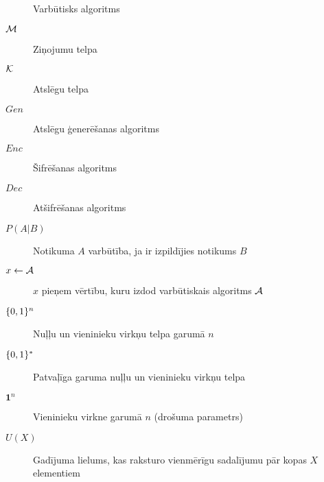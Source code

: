 \begin{description}
    \item[\ppt] Varbūtisks algoritms
    \item[$\mathcal{M}$]Ziņojumu telpa
    \item[$\mathcal{K}$]Atslēgu telpa
    \item[$Gen$]Atslēgu ģenerēšanas algoritms
    \item[$Enc$]Šifrēšanas algoritms
    \item[$Dec$]Atšifrēšanas algoritms
    \item[$P(A|B)$]Notikuma $A$ varbūtība, ja ir izpildījies notikums $B$
    \item[$x \leftarrow \mathcal{A}$]$x$ pieņem vērtību, kuru izdod varbūtiskais algoritms $\mathcal{A}$
    \item[$\{0,1\}^n$] Nuļļu un vieninieku virkņu telpa garumā $n$ 
    \item[$\{0,1\}^*$]Patvaļīga garuma nuļļu un vieninieku virkņu telpa
    \item[$\mathbf{1}^n$]Vieninieku virkne garumā $n$ (drošuma parametrs)
    \item[$U(X)$] Gadījuma lielums, kas raksturo vienmērīgu sadalījumu pār kopas $X$ elementiem
\end{description}

